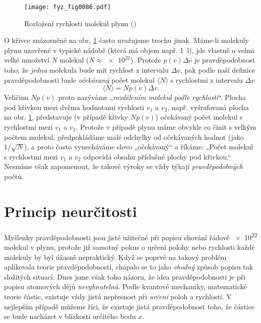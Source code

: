     \begin{figure}[ht!]  %
      \centering
      \texttt{[image: fyz\_fig0086.pdf]}
      \caption{Rozložení rychlosti molekul plynu  (\cite[s.~88]{Feynman01})}
      \label{fyz:fig0086}
    \end{figure}
    
    O křivce znázorněné na obr, \ref{fyz:fig0086} často uvažujeme trochu jinak. Máme-li molekuly 
    plynu uzavřené v typické nádobě (která má objem např. \SI{1}{\litre}), jde vlastně o velmi 
    velké množství \(N\) molekul (\(N\approx\num{e22}\)). Protože \(p(v)\Delta v\) je 
    pravděpodobnost toho, že \emph{jedna} molekula bude mít rychlost z intervalu \(\Delta v\), pak 
    podle naší definice pravděpodobnosti bude \emph{očekávaný} počet molekul \(\langle N\rangle\) s 
    rychlostmi z intervalu \(\Delta v\)
    \begin{equation}\label{fyz:eq092}
      \langle N\rangle = Np(v)\Delta v.
    \end{equation}
    Veličinu \(Np(v)\) proto nazýváme „\emph{rozdělením molekul podle rychlosti}“. Plocha pod 
    křivkou mezi dvěma hodnotami rychlosti \(v_1\) a \(v_2\), např. vyšrafovaná plocha na obr. 
    \ref{fyz:fig0086}, představuje (v případě křivky \(Np(v)\)) očekávaný počet molekul s rychlostmi 
    mezi \(v_1\) a \(v_2\). Protože v případě plynu máme obvykle co činit s velkým počtem molekul, 
    předpokládáme malé odchylky od očekávaných hodnot (jako \(1/\sqrt{N}\)), a proto často 
    vynecháváme slovo „očekávaný“ a říkáme: „Počet molekul s rychlostmi mezi \(v_1\) a \(v_2\) 
    odpovídá obsahu příslušné plochy pod křivkou.“ Nesmíme však zapomenout, že takové výroky se 
    vždy týkají \emph{pravděpodobných} počtů.
    
  \section{Princip neurčitosti}
    Myšlenky pravděpodobnosti jsou jisté užitečné při popisu chování řádově \num{e22} molekul v 
    plynu, protože již samotný pokus o určení polohy nebo rychlosti každé molekuly by byl úžasně 
    nepraktický. Když se poprvé na takový problém aplikovala teorie pravděpodobnosti, chápalo se to 
    jako \emph{vhodný} způsob popisu tak složitých situací. Dnes jsme však toho názoru, že idea 
    pravděpodobnosti je při popisu atomových dějů \emph{nevyhnutelná}. Podle kvantové mechaniky, 
    matematické teorie částic, existuje vždy jistá nepřesnost při \emph{určení} poloh a rychlostí. 
    V nejlepším případě můžeme říci, že existuje jistá pravděpodobnost toho, že částice se bude 
    nacházet v blízkosti určitého bodu \(x\).
    

